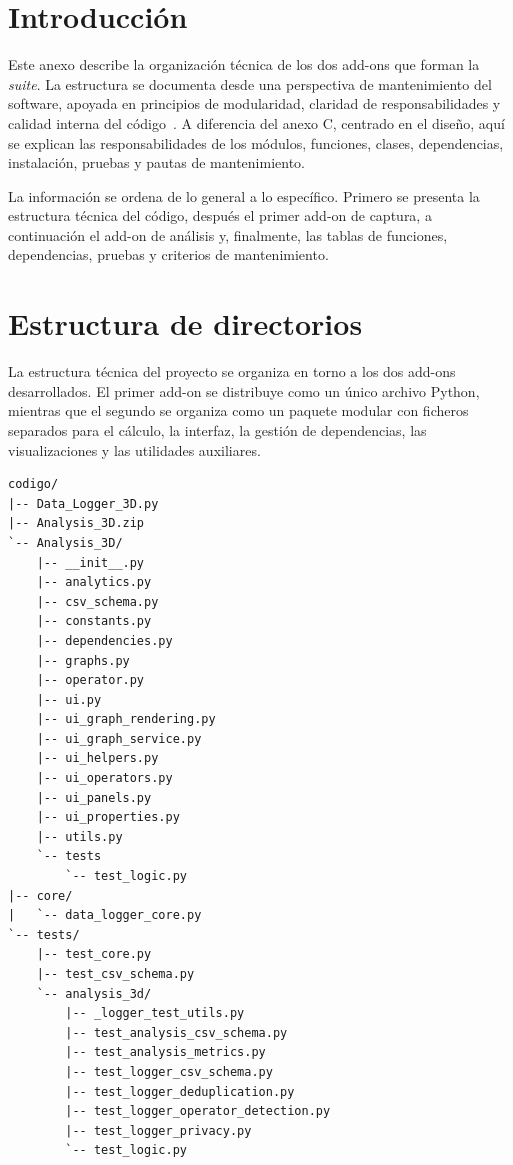 \label{apendice:documentacion_tecnica_programacion}
\label{apendice:programacion}

\section{Introducción}
\label{sec:d-introduccion}

Este anexo describe la organización técnica de los dos add-ons que forman la \textit{suite}. La estructura se documenta desde una perspectiva de mantenimiento del software, apoyada en principios de modularidad, claridad de responsabilidades y calidad interna del código~\cite{parnas1972criteria,pressman2005}. A diferencia del anexo C, centrado en el diseño, aquí se explican las responsabilidades de los módulos, funciones, clases, dependencias, instalación, pruebas y pautas de mantenimiento.

La información se ordena de lo general a lo específico. Primero se presenta la estructura técnica del código, después el primer add-on de captura, a continuación el add-on de análisis y, finalmente, las tablas de funciones, dependencias, pruebas y criterios de mantenimiento.

\section{Estructura de directorios}
\label{sec:d-estructura-directorios}

La estructura técnica del proyecto se organiza en torno a los dos add-ons desarrollados. El primer add-on se distribuye como un único archivo Python, mientras que el segundo se organiza como un paquete modular con ficheros separados para el cálculo, la interfaz, la gestión de dependencias, las visualizaciones y las utilidades auxiliares.

\begin{verbatim}
codigo/
|-- Data_Logger_3D.py
|-- Analysis_3D.zip
`-- Analysis_3D/
    |-- __init__.py
    |-- analytics.py
    |-- csv_schema.py
    |-- constants.py
    |-- dependencies.py
    |-- graphs.py
    |-- operator.py
    |-- ui.py
    |-- ui_graph_rendering.py
    |-- ui_graph_service.py
    |-- ui_helpers.py
    |-- ui_operators.py
    |-- ui_panels.py
    |-- ui_properties.py
    |-- utils.py
    `-- tests
        `-- test_logic.py
|-- core/
|   `-- data_logger_core.py
`-- tests/
    |-- test_core.py
    |-- test_csv_schema.py
    `-- analysis_3d/
        |-- _logger_test_utils.py
        |-- test_analysis_csv_schema.py
        |-- test_analysis_metrics.py
        |-- test_logger_csv_schema.py
        |-- test_logger_deduplication.py
        |-- test_logger_operator_detection.py
        |-- test_logger_privacy.py
        `-- test_logic.py
\end{verbatim}


